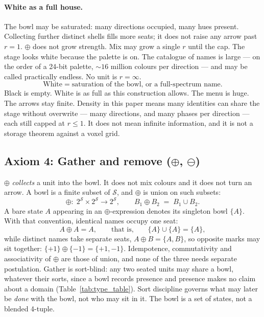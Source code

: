 \documentclass[12pt, a4paper]{article}
\begin{document}
\paragraph{White as a full house.}
The bowl may be saturated: many directions occupied, many hues present.
Collecting further distinct shells fills more seats; it does not raise
any arrow past $r=1$. $\oplus$ does not grow strength. Mix may grow a
single $r$ until the cap. The stage looks white because the palette is on. The catalogue
of names is large --- on the order of a 24-bit palette,
$\sim 16$ million colours per direction --- and may be called
practically endless. No unit is $r=\infty$.
\begin{equation}
    \text{White} \;=\; \text{saturation of the bowl, or a full-spectrum name.}
    \label{eq:white_state}
\end{equation}
Black is empty. White is as full as this construction allows. The
menu is huge. The arrows stay finite.
Density in this paper means many identities can share the stage
without overwrite --- many directions, and many phases per direction
--- each still capped at $r\le 1$. It does not mean infinite
information, and it is not a storage theorem against a voxel grid.

\subsection{Axiom 4: Gather and remove ($\oplus$, $\ominus$)}
\label{subsec:axiom_idempotence}
$\oplus$ \emph{collects} a unit into the bowl. It does not mix colours
and it does not turn an arrow. A bowl is a finite subset of
$\mathcal{S}$, and $\oplus$ is union on such subsets:
\[
\oplus:\; 2^{\mathcal{S}}\times 2^{\mathcal{S}}
\longrightarrow 2^{\mathcal{S}},
\qquad
B_1 \oplus B_2 \;=\; B_1 \cup B_2 .
\]
A bare state $A$ appearing in an $\oplus$-expression denotes its
singleton bowl $\{A\}$. With that convention, identical names occupy
one seat:
\begin{equation}
    A \oplus A = A,
    \qquad\text{that is,}\qquad
    \{A\}\cup\{A\}=\{A\},
    \label{eq:idempotence_formal}
\end{equation}
while distinct names take separate seats, $A\oplus B=\{A,B\}$, so
opposite marks may sit together:
$\{+1\}\oplus\{-1\}=\{+1,-1\}$.
Idempotence, commutativity and associativity of $\oplus$ are those of
union, and none of the three needs separate postulation.
Gather is sort-blind: any two seated units may share a bowl, whatever
their sorts, since a bowl records presence and presence makes no claim
about a domain (Table~\ref{tab:type_table}). Sort discipline governs
what may later be \emph{done} with the bowl, not who may sit in it.
The bowl is a set of states, not a blended 4-tuple.
\end{document}
